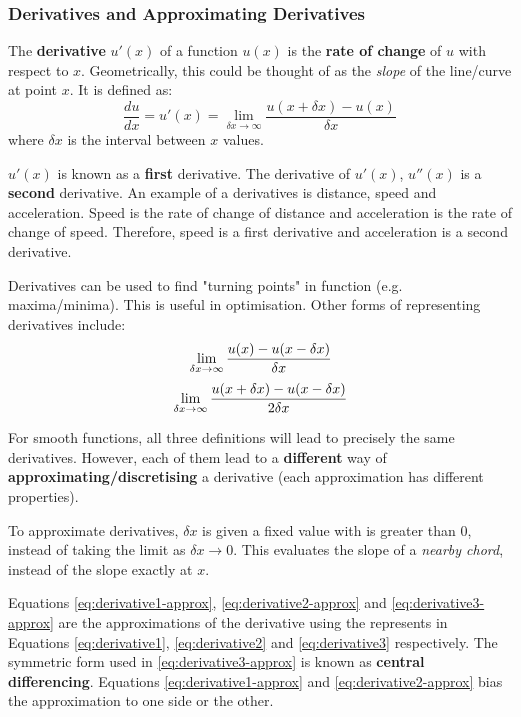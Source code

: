 \documentclass{article}
\begin{document}
\subsubsection{Derivatives and Approximating Derivatives}
The \textbf{derivative} $u'(x)$ of a function $u(x)$ is the \textbf{rate of change} of $u$ with respect to $x$. Geometrically, this could be thought of as the \textit{slope} of the line/curve at point $x$. It is defined as:
\begin{equation}
	\frac{du}{dx} = u'(x) = \lim_{\delta x \rightarrow \infty} \frac{u(x + \delta x) - u(x)}{\delta x}
	\label{eq:derivative1}
\end{equation}
where $\delta x$ is the interval between $x$ values.

$u'(x)$ is known as a \textbf{first} derivative. The derivative of $u'(x)$, $u''(x)$  is a \textbf{second} derivative. An example of a derivatives is distance, speed and acceleration. Speed is the rate of change of distance and acceleration is the rate of change of speed. Therefore, speed is a first derivative and acceleration is a second derivative.

Derivatives can be used to find "turning points" in function (e.g. maxima/minima). This is useful in optimisation.  Other forms of representing derivatives include:
\begin{equation}\\
	\lim_{\delta x \rightarrow \infty} \frac{u(x) - u(x - \delta x)}{\delta x}
	\label{eq:derivative2}
\end{equation}
\begin{equation}\\
	\lim_{\delta x \rightarrow \infty} \frac{u(x + \delta x) - u(x - \delta x)}{2\delta x} \\
	\label{eq:derivative3}
\end{equation}

For smooth functions, all three definitions will lead to precisely the same derivatives. However, each of them lead to a \textbf{different} way of \textbf{approximating/discretising} a derivative (each approximation has different properties).

To approximate derivatives, $\delta x$ is given a fixed value with is greater than 0, instead of taking the limit as $\delta x \rightarrow 0$. This evaluates the slope of a \textit{nearby chord}, instead of the slope exactly at $x$.

Equations \ref{eq:derivative1-approx}, \ref{eq:derivative2-approx} and \ref{eq:derivative3-approx} are the approximations of the derivative using the represents in Equations \ref{eq:derivative1}, \ref{eq:derivative2} and \ref{eq:derivative3} respectively. The symmetric form used in  \ref{eq:derivative3-approx} is known as \textbf{central differencing}. Equations \ref{eq:derivative1-approx}  and \ref{eq:derivative2-approx}  bias the approximation to one side or the other.
\end{document}
